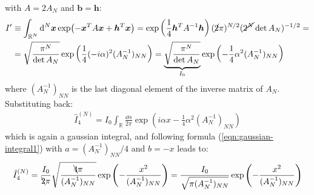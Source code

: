 \documentclass[../template.tex]{subfiles}
\begin{document}
with $A = 2 A_N$ and $\bm{b} = \bm{h}$:
\begin{align*}
    I' &\equiv \int_{\mathbb{R}^N} \dd[N]{\bm{x}} \exp(-\bm{x}^T A \bm{x} + \bm{h}^T \bm{x}) = \exp\left(\frac{1}{4} \bm{h}^T A^{-1} \bm{h} \right) (\cancel{2}\pi)^{N/2} (\cancel{2^N} \operatorname{det}A_N )^{-1/2} =\\
    &= \sqrt{\frac{\pi ^N}{\operatorname{det} A_N } } \exp\left(\frac{1}{4}(-i \alpha)^2 (A^{-1}_N)_{NN} \right) = \underbrace{\sqrt{\frac{\pi^N}{\operatorname{det} A_N} }}_{I_0}  \exp\left(-\frac{1}{4} \alpha^2 (A_N^{-1})_{NN} \right)
\end{align*}
where $(A_N^{-1})_{NN}$ is the last diagonal element of the inverse matrix of $A_N$. Substituting back:
\begin{align*}
    \hat{I}_4^{(N)} = I_0 \int_{\mathbb{R}} \frac{\dd{\alpha}}{2 \pi} \exp\left(i \alpha x - \frac{1}{4} \alpha^2 (A_N^{-1})_{NN} \right)
\end{align*}
which is again a gaussian integral, and following formula (\ref{eqn:gaussian-integral1}) with $a = (A_N^{-1})_{NN}/4$ and $b = -x$ leads to: 
\begin{align*}
    \hat{I}_4^{(N)} = \frac{I_0}{\bcancel{2} \pi} \sqrt{\frac{\bcancel{4} \pi}{(A_N^{-1})_{NN}} } \exp\left(-\frac{x^2}{(A_N^{-1})_{NN}} \right) = \frac{I_0}{\sqrt{ \pi (A_N^{-1})_{NN}}} \exp\left(-\frac{x^2}{(A_N^{-1})_{NN}} \right) 
\end{align*}
\end{document}
